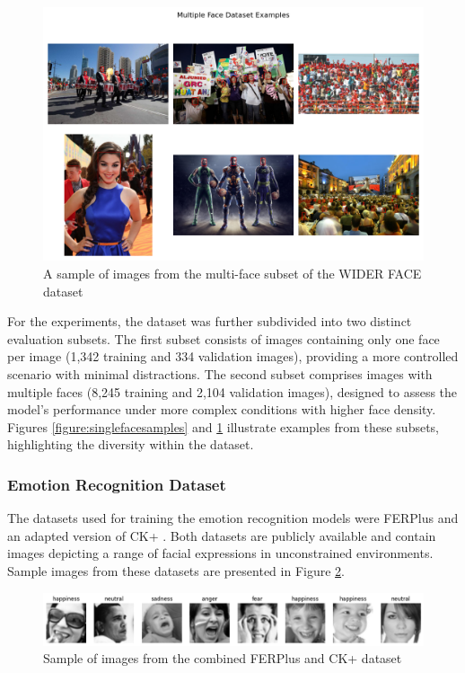 \begin{figure}[!htb]
    \centering{}
    \includegraphics[scale=0.35]{m+m_images/multi_face_figure_samples.png}
    \caption{A sample of images from the multi-face subset of the WIDER FACE dataset}
    \label{figure:multifacesamples}
\end{figure}

For the experiments, the dataset was further subdivided into two distinct evaluation subsets. The first subset consists of images containing only one face per image (1,342 training and 334 validation images), providing a more controlled scenario with minimal distractions. The second subset comprises images with multiple faces (8,245 training and 2,104 validation images), designed to assess the model's performance under more complex conditions with higher face density. Figures \ref{figure:singlefacesamples} and \ref{figure:multifacesamples} illustrate examples from these subsets, highlighting the diversity within the dataset.

\subsubsection{Emotion Recognition Dataset}

The datasets used for training the emotion recognition models were FERPlus \cite{BarsoumICMI2016} and an adapted version of CK+ \cite{5543262}. Both datasets are publicly available and contain images depicting a range of facial expressions in unconstrained environments. Sample images from these datasets are presented in Figure \ref{figure:sample_imgs}.

\begin{figure}[!htb]
    \centering
    \includegraphics[scale=0.5]{fed_images/random_imgs.png}
    \caption{Sample of images from the combined FERPlus and CK+ dataset}
    \label{figure:sample_imgs}
\end{figure}

